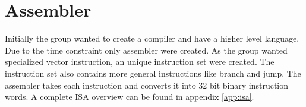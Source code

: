 \section{Assembler}
Initially the group wanted to create a compiler and have a higher level language.
Due to the time constraint only assembler were created.
As the group wanted specialized vector instruction, an unique instruction set were created.
The instruction set also contains more general instructions like branch and jump.
The assembler takes each instruction and converts it into 32 bit binary instruction words.
A complete ISA overview can be found in appendix \ref{app:isa}.
